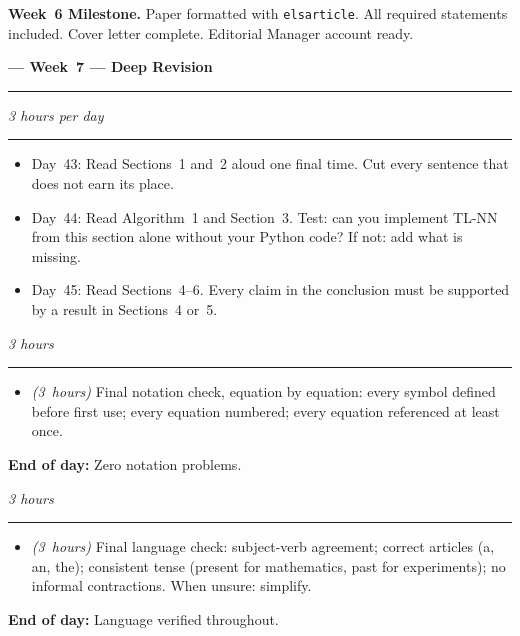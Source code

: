\documentclass[12pt,a4paper]{article}
\newcommand{\hrs}[1]{\textit{\color{darkgray}(#1~hours)}}
\newcommand{\weekheading}[2]{%
  \vspace{0.8em}
  \noindent
  {\large\bfseries\color{midblue}--- Week~#1 ---
  \hfill\normalsize\normalfont\color{darkgray}#2}
  \vspace{0.2em}
  \\{\color{midblue}\rule{\linewidth}{0.6pt}}
  \vspace{0.3em}
}
\newcommand{\dayheading}[2]{%
  \vspace{0.3em}
  \noindent{\bfseries\color{darkblue}Day~#1}%
  \hfill{\small\color{darkgray}\textit{#2}}%
  \\[-0.4em]{\color{midgray}\rule{\linewidth}{0.4pt}}%
  \vspace{0.1em}
}
\begin{document}
\begin{tcolorbox}[milestonestyle]
\noindent\textbf{\color{darkred}Week~6 Milestone.}
Paper formatted with \texttt{elsarticle}. All required
statements included. Cover letter complete.
Editorial Manager account ready.
\end{tcolorbox}

\weekheading{7}{Deep Revision}

\begin{tcolorbox}[daystyle]
\dayheading{43--45}{3 hours per day}
\begin{itemize}[leftmargin=1.8em,itemsep=3pt]
  \item[\color{midblue}$\bullet$]
    Day~43: Read Sections~1 and~2 aloud one final time.
    Cut every sentence that does not earn its place.
  \item[\color{midblue}$\bullet$]
    Day~44: Read Algorithm~1 and Section~3. Test: can you
    implement TL-NN from this section alone without your
    Python code? If not: add what is missing.
  \item[\color{midblue}$\bullet$]
    Day~45: Read Sections~4--6. Every claim in the
    conclusion must be supported by a result in Sections~4
    or~5.
\end{itemize}
\end{tcolorbox}

\begin{tcolorbox}[daystyle]
\dayheading{46}{3 hours}
\begin{itemize}[leftmargin=1.8em,itemsep=3pt]
  \item[\color{midblue}$\bullet$]
    \hrs{3} Final notation check, equation by equation:
    every symbol defined before first use; every equation
    numbered; every equation referenced at least once.
\end{itemize}
\noindent\textbf{End of day:} Zero notation problems.
\end{tcolorbox}

\begin{tcolorbox}[daystyle]
\dayheading{47}{3 hours}
\begin{itemize}[leftmargin=1.8em,itemsep=3pt]
  \item[\color{midblue}$\bullet$]
    \hrs{3} Final language check: subject-verb agreement;
    correct articles (a, an, the); consistent tense
    (present for mathematics, past for experiments);
    no informal contractions. When unsure: simplify.
\end{itemize}
\noindent\textbf{End of day:} Language verified throughout.
\end{tcolorbox}
\end{document}
